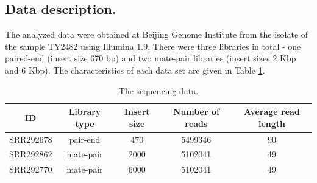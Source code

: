 \documentclass{article}
\begin{document}
\subsection{Data description.}
The analyzed data were obtained at Beijing Genome Institute from the isolate of the sample TY2482 using Illumina 1.9. There were three libraries in total - one paired-end (insert size 670 bp) and two mate-pair libraries (insert sizes 2 Kbp and 6 Kbp). The characteristics of each data set are given in Table \ref{tab:1}.

	\begin{table} 
	\centering
	\begin{tabular}{|c|c|c|c|c|}
		\hline
		ID & Library type & Insert size & Number of reads & Average read length \\
		\hline
		SRR292678 & pair-end  & 470 & 5499346 & 90\\
		\hline
		SRR292862 & mate-pair & 2000 &  5102041 & 49\\
		\hline
		SRR292770 & mate-pair & 6000&   5102041  & 49\\
		\hline
	\end{tabular}
	\caption{  The sequencing data. }
	\label{tab:1}
\end{table}
\end{document}
